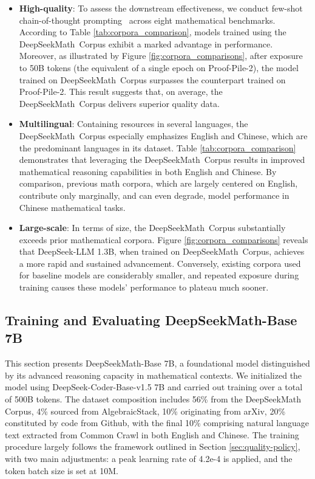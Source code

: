 \begin{itemize}[topsep=0pt]
\begin{itemize}[topsep=0pt]
    \item \textbf{High-quality}:  
    To assess the downstream effectiveness, we conduct few-shot chain-of-thought prompting~\cite{cot} across eight mathematical benchmarks. According to Table \ref{tab:corpora_comparison}, models trained using the DeepSeekMath~Corpus exhibit a marked advantage in performance. Moreover, as illustrated by Figure \ref{fig:corpora_comparisons}, after exposure to 50B tokens (the equivalent of a single epoch on Proof-Pile-2), the model trained on DeepSeekMath~Corpus surpasses the counterpart trained on Proof-Pile-2. This result suggests that, on average, the DeepSeekMath~Corpus delivers superior quality data. 
    \item \textbf{Multilingual}:  
    Containing resources in several languages, the DeepSeekMath~Corpus especially emphasizes English and Chinese, which are the predominant languages in its dataset. Table \ref{tab:corpora_comparison} demonstrates that leveraging the DeepSeekMath~Corpus results in improved mathematical reasoning capabilities in both English and Chinese. By comparison, previous math corpora, which are largely centered on English, contribute only marginally, and can even degrade, model performance in Chinese mathematical tasks.
    \item \textbf{Large-scale}:  
    In terms of size, the DeepSeekMath~Corpus substantially exceeds prior mathematical corpora. Figure \ref{fig:corpora_comparisons} reveals that DeepSeek-LLM 1.3B, when trained on DeepSeekMath~Corpus, achieves a more rapid and sustained advancement. Conversely, existing corpora used for baseline models are considerably smaller, and repeated exposure during training causes these models’ performance to plateau much sooner.
\end{itemize}

\subsection{Training and Evaluating DeepSeekMath-Base 7B}

This section presents DeepSeekMath-Base 7B, a foundational model distinguished by its advanced reasoning capacity in mathematical contexts. We initialized the model using DeepSeek-Coder-Base-v1.5 7B \citep{deepseek-coder} and carried out training over a total of 500B tokens. The dataset composition includes 56\% from the DeepSeekMath Corpus, 4\% sourced from AlgebraicStack, 10\% originating from arXiv, 20\% constituted by code from Github, with the final 10\% comprising natural language text extracted from Common Crawl in both English and Chinese. The training procedure largely follows the framework outlined in Section \ref{sec:quality-policy}, with two main adjustments: a peak learning rate of 4.2e-4 is applied, and the token batch size is set at 10M.


\end{itemize}
